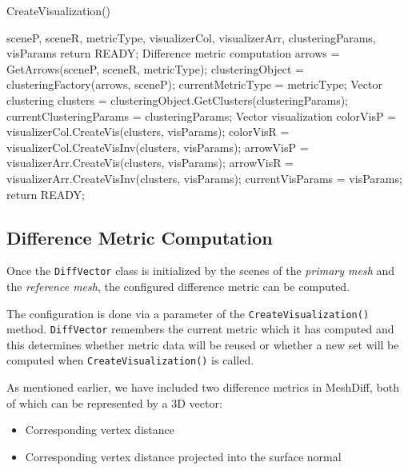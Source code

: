 \begin{algorithm}[H]
\caption{CreateVisualization()}
\label{algo:create_vis}
\begin{algorithmic}[1]

\Require sceneP, sceneR, metricType, visualizerCol, visualizerArr, clusteringParams, visParams
\Statex
{}
	\State return READY;
\EndIf
\Statex \Comment Difference metric computation
	\State arrows = GetArrows(sceneP, sceneR, metricType);
    \State clusteringObject = clusteringFactory(arrows, sceneP);
    \State currentMetricType = metricType;
\EndIf
\Statex \Comment Vector clustering
\State clusters = clusteringObject.GetClusters(clusteringParams);
\State currentClusteringParams = clusteringParams;
\Statex \Comment Vector visualization
	\State colorVisP = visualizerCol.CreateVis(clusters, visParams);
    \State colorVisR = visualizerCol.CreateVisInv(clusters, visParams);
\EndIf
{}
	\State arrowVisP = visualizerArr.CreateVis(clusters, visParams);
    \State arrowVisR = visualizerArr.CreateVisInv(clusters, visParams);
\EndIf
\State currentVisParams = visParams;
\Statex
\State return READY;
\end{algorithmic}
\end{algorithm}

\subsection{Difference Metric Computation}
\label{sec:analysis_metric}

Once the \verb+DiffVector+ class is initialized by the scenes of the {\it primary mesh} and the {\it reference mesh}, the configured difference metric can be computed.

The configuration is done via a parameter of the \verb+CreateVisualization()+ method. \verb+DiffVector+ remembers the current metric which it has computed and this determines whether metric data will be reused or whether a new set will be computed when \verb+CreateVisualization()+ is called.

As mentioned earlier, we have included two difference metrics in MeshDiff, both of which can be represented by a 3D vector:

\begin{itemize}
\item Corresponding vertex distance
\item Corresponding vertex distance projected into the surface normal
\end{itemize}

